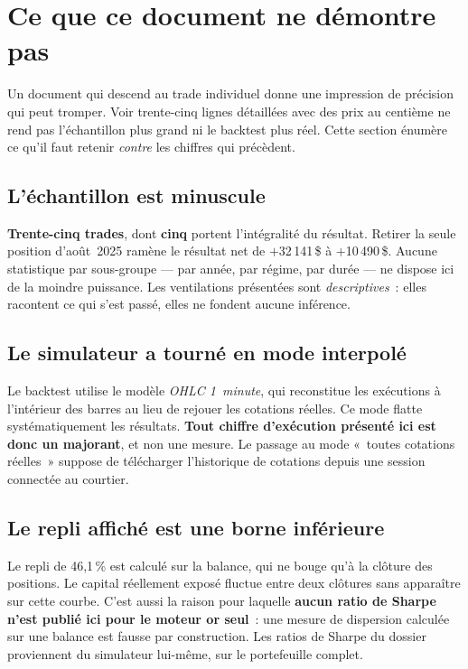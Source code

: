 \section{Ce que ce document ne démontre pas}
\label{sec:limites}

Un document qui descend au trade individuel donne une impression de précision
qui peut tromper. Voir trente-cinq lignes détaillées avec des prix au centième
ne rend pas l'échantillon plus grand ni le backtest plus réel. Cette section
énumère ce qu'il faut retenir \emph{contre} les chiffres qui précèdent.

\subsection*{L'échantillon est minuscule}

\textbf{Trente-cinq trades}, dont \textbf{cinq} portent l'intégralité du
résultat. Retirer la seule position d'août~2025 ramène le résultat net de
$+$32\,141\,\$ à $+$10\,490\,\$. Aucune statistique par sous-groupe --- par
année, par régime, par durée --- ne dispose ici de la moindre puissance. Les
ventilations présentées sont \emph{descriptives}~: elles racontent ce qui s'est
passé, elles ne fondent aucune inférence.

\subsection*{Le simulateur a tourné en mode interpolé}

Le backtest utilise le modèle \emph{OHLC 1~minute}, qui reconstitue les
exécutions à l'intérieur des barres au lieu de rejouer les cotations réelles.
Ce mode flatte systématiquement les résultats. \textbf{Tout chiffre
d'exécution présenté ici est donc un majorant}, et non une mesure. Le passage
au mode «~toutes cotations réelles~» suppose de télécharger l'historique de
cotations depuis une session connectée au courtier.

\subsection*{Le repli affiché est une borne inférieure}

Le repli de 46,1\,\% est calculé sur la balance, qui ne bouge qu'à la clôture
des positions. Le capital réellement exposé fluctue entre deux clôtures sans
apparaître sur cette courbe. C'est aussi la raison pour laquelle \textbf{aucun
ratio de Sharpe n'est publié ici pour le moteur or seul}~: une mesure de
dispersion calculée sur une balance est fausse par construction. Les ratios de
Sharpe du dossier proviennent du simulateur lui-même, sur le portefeuille
complet.

